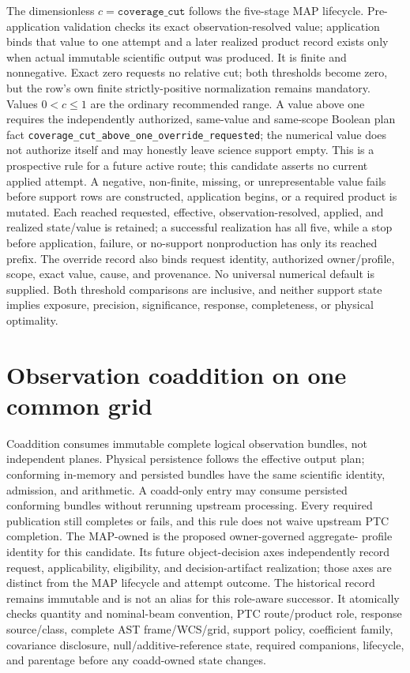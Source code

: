 \documentclass[10pt]{article}
\newcommand{\code}[1]{\nolinkurl{#1}}
\begin{document}
The dimensionless \(c=\texttt{coverage\_cut}\) follows the five-stage MAP
lifecycle. Pre-application validation checks its exact observation-resolved
value; application binds that value to one attempt and a later realized product
record exists only when actual immutable scientific output was produced. It is
finite and nonnegative.
Exact zero requests no relative cut; both thresholds become zero, but the
row's own finite strictly-positive normalization remains mandatory. Values
\(0<c\le1\) are the ordinary recommended range. A value above one requires the
independently authorized, same-value and same-scope Boolean plan fact
\code{coverage_cut_above_one_override_requested}; the numerical value does not
authorize itself and may honestly leave science support empty.
\SCIMapEmptySupportDispositionBody{} This is a prospective rule for a future active
route; this candidate asserts no current applied attempt. A negative,
non-finite, missing, or unrepresentable value fails before support
rows are constructed, application begins, or a required product is mutated.
Each reached requested, effective, observation-resolved, applied, and realized
state/value is retained; a successful realization has all five, while a stop
before application, failure, or no-support nonproduction has only its reached
prefix. The override record also
binds request identity, authorized owner/profile, scope, exact value, cause,
and provenance. No
universal numerical default is supplied. Both threshold comparisons are
inclusive, and neither support state implies exposure, precision,
significance, response, completeness, or physical optimality.

\clearpage
\section{Observation coaddition on one common grid}

Coaddition consumes immutable complete logical observation bundles, not
independent planes. Physical persistence follows the effective output plan;
conforming in-memory and persisted bundles have the same scientific identity,
admission, and arithmetic. A coadd-only entry may consume persisted conforming
bundles without rerunning upstream processing. Every required publication
still completes or fails, and this rule does not waive upstream PTC completion.
The MAP-owned \SCIMapCoaddProfile{} is the proposed owner-governed aggregate-
profile identity for this candidate. \SCIMapCandidateProfileStatusDefinition{}
Its future object-decision axes independently record request, applicability,
eligibility, and decision-artifact realization; those axes are distinct from
the MAP lifecycle and attempt outcome.
The historical \SCIMapCoaddProfileHistorical{} record remains immutable and
is not an alias for this role-aware successor. It atomically checks quantity
and nominal-beam convention, PTC route/product role, response source/class,
complete AST frame/WCS/grid, support policy, coefficient family, covariance
disclosure, null/additive-reference state, required companions, lifecycle,
and parentage before any coadd-owned state changes.
\end{document}
